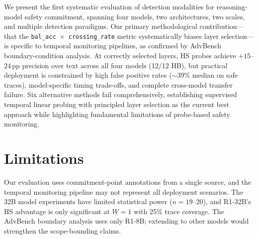 \documentclass[11pt]{article}
\newcommand{\pp}{\,\text{pp}}
\begin{document}
We present the first systematic evaluation of detection modalities for reasoning-model safety commitment, spanning four models, two architectures, two scales, and multiple detection paradigms.
Our primary methodological contribution---that the \texttt{bal\_acc $\times$ crossing\_rate} metric systematically biases layer selection---is specific to temporal monitoring pipelines, as confirmed by AdvBench boundary-condition analysis.
At correctly selected layers, HS probes achieve $+15$--$24\pp$ precision over text across all four models (12/12 HB), but practical deployment is constrained by high false positive rates ($\sim$39\% median on safe traces), model-specific timing trade-offs, and complete cross-model transfer failure.
Six alternative methods fail comprehensively, establishing supervised temporal linear probing with principled layer selection as the current best approach while highlighting fundamental limitations of probe-based safety monitoring.

\section*{Limitations}

Our evaluation uses commitment-point annotations from a single source, and the temporal monitoring pipeline may not represent all deployment scenarios.
The 32B model experiments have limited statistical power ($n=19$--$20$), and R1-32B's HS advantage is only significant at $W=1$ with 25\% trace coverage.
The AdvBench boundary analysis uses only R1-8B; extending to other models would strengthen the scope-bounding claims.



\end{document}
